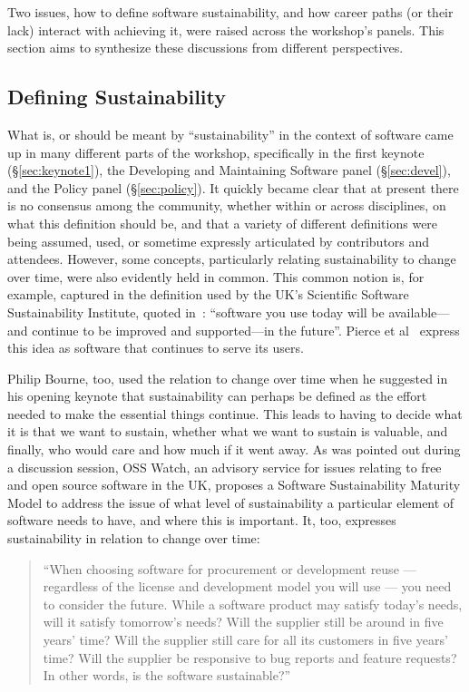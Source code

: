 \documentclass[11pt, oneside]{amsart}
\newcommand{\note}[1]{ {\textcolor{red}    { #1 }}}
\begin{document}
Two issues, how to define software sustainability, and how career
paths (or their lack) interact with achieving it, were raised across
the workshop's panels.  This section aims to synthesize these
discussions from different perspectives.

\subsection{Defining Sustainability}  \label{sec:defining-sustainability}%

What is, or should be meant by ``sustainability'' in the context of
software came up in many different parts of the workshop, specifically
in the first keynote (\S\ref{sec:keynote1}), the Developing and
Maintaining Software panel (\S\ref{sec:devel}), and the Policy panel
(\S\ref{sec:policy}). It quickly became clear that at present there is
no consensus among the community, whether within or across
disciplines, on what this definition should be, and that a variety of
different definitions were being assumed, used, or sometime expressly
articulated by contributors and attendees. However, some concepts,
particularly relating sustainability to change over time, were also
evidently held in common. This common notion is, for example, captured
in the definition used by the UK's Scientific Software Sustainability
Institute, quoted in~\cite{Venters_WSSSPE}: ``software you use today
will be available---and continue to be improved and supported---in the
future''. Pierce et al~\cite{Pierce_WSSSPE} express this idea as
software that continues to serve its users.

Philip Bourne, too, used the relation to change over time when he
suggested in his opening keynote that sustainability can perhaps be
defined as the effort needed to make the essential things continue.
This leads to having to decide what it is that we want to sustain,
whether what we want to sustain is valuable, and finally, who would
care and how much if it went away. As was pointed out during a
discussion session, OSS Watch, an advisory service for issues relating
to free and open source software in the UK, proposes a Software
Sustainability Maturity Model to address the issue of what level of
sustainability a particular element of software needs to have, and
where this is important. It, too, expresses sustainability in relation
to change over time:
\begin{quote}``When choosing software for procurement or
development reuse --- regardless of the license and development model
you will use --- you need to consider the future. While a software
product may satisfy today's needs, will it satisfy tomorrow's needs?
Will the supplier still be around in five years' time? Will the
supplier still care for all its customers in five years' time? Will
the supplier be responsive to bug reports and feature requests? In
other words, is the software sustainable?''~\cite{OSS-ssmm-web}
\end{quote}
\end{document}
